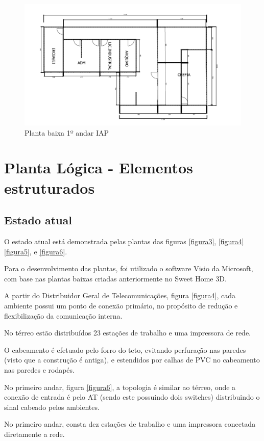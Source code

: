 \documentclass[	DIV=calc,%
							paper=a4,%
							fontsize=12pt,%
							onecolumn]{scrartcl}	 					%
\begin{document}
\clearpage
{}
\recalctypearea
\begin{figure}[h!]
	\centering
	\includegraphics[width=\textwidth]{figura2.png}
	\caption[Planta baixa 1º andar IAP]{Planta baixa 1º andar IAP}
	\label{fig:figura2}
\end{figure}
\section{Planta Lógica - Elementos estruturados}

\subsection{Estado atual}

O estado atual está demonstrada pelas plantas das figuras \ref{figura3}, \ref{figura4}\, \ref{figura5}, e \ref{figura6}.\par
Para o desenvolvimento das plantas, foi utilizado o software Visio da Microsoft, com base nas plantas baixas criadas anteriormente no Sweet Home 3D.\par
A partir do Distribuidor Geral de Telecomunicações, figura \ref{figura4}, cada ambiente possui um ponto de conexão primário, no propósito de redução e flexibilização da comunicação interna.\par
No térreo estão distribuídos 23 estações de trabalho e uma impressora de rede.\par
O cabeamento é efetuado pelo forro do teto, evitando perfuração nas paredes (visto que a construção é antiga), e estendidos por calhas de PVC no cabeamento nas paredes e rodapés.\par
No primeiro andar, figura \ref{figura6}, a topologia é similar ao térreo, onde a conexão de entrada é pelo AT (sendo este possuindo dois switches) distribuindo o sinal cabeado pelos ambientes.\par
No primeiro andar, consta dez estações de trabalho e uma impressora conectada diretamente a rede.
%
\end{document}
